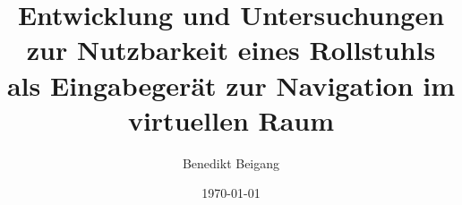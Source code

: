 \title{Entwicklung und Untersuchungen zur Nutzbarkeit eines Rollstuhls als Eingabegerät zur Navigation im virtuellen Raum}
\author{Benedikt Beigang}
\date{\today}